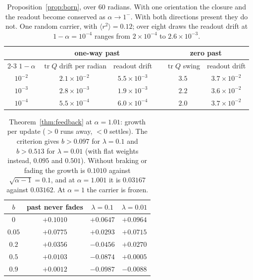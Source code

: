 \documentclass[11pt]{amsart}
\theoremstyle{definition}
\theoremstyle{remark}
\newcommand{\tr}{\operatorname{tr}}
\begin{document}
\begin{table}[h]
\centering\small
\begin{tabular}{cccccc}
\toprule
 & \multicolumn{2}{c}{one-way past} & & \multicolumn{2}{c}{zero past}\\
\cmidrule{2-3}\cmidrule{5-6}
$1-\alpha$ & $\tr Q$ drift per radian & readout drift & & $\tr Q$ swing & readout drift\\
\midrule
$10^{-2}$ & $2.1\times10^{-2}$ & $5.5\times10^{-3}$ & & $3.5$ & $3.7\times10^{-2}$\\
$10^{-3}$ & $2.8\times10^{-3}$ & $1.9\times10^{-3}$ & & $2.2$ & $3.6\times10^{-2}$\\
$10^{-4}$ & $5.5\times10^{-4}$ & $6.0\times10^{-4}$ & & $2.0$ & $3.7\times10^{-2}$\\
\bottomrule
\end{tabular}
\caption{Proposition~\ref{prop:born}, over $60$ radians. With one orientation the closure and the readout become conserved as $\alpha\to1^-$. With both directions present they do not. One random carrier, with $\langle r^2\rangle=0.12$; over eight draws the readout drift at $1-\alpha=10^{-4}$ ranges from $2\times10^{-4}$ to $2.6\times10^{-3}$.}
\label{tab:closure}
\end{table}

\begin{table}[h]
\centering\small
\begin{tabular}{cccc}
\toprule
$b$ & past never fades & $\lambda=0.1$ & $\lambda=0.01$\\
\midrule
$0$ & $+0.1010$ & $+0.0647$ & $+0.0964$\\
$0.05$ & $+0.0775$ & $+0.0293$ & $+0.0715$\\
$0.2$ & $+0.0356$ & $-0.0456$ & $+0.0270$\\
$0.5$ & $+0.0103$ & $-0.0874$ & $+0.0005$\\
$0.9$ & $+0.0012$ & $-0.0987$ & $-0.0088$\\
\bottomrule
\end{tabular}
\caption{Theorem~\ref{thm:feedback} at $\alpha=1.01$: growth per update ($>0$ runs away, $<0$ settles). The criterion gives $b>0.097$ for $\lambda=0.1$ and $b>0.513$ for $\lambda=0.01$ (with flat weights instead, $0.095$ and $0.501$). Without braking or fading the growth is $0.1010$ against $\sqrt{\alpha-1}=0.1$, and at $\alpha=1.001$ it is $0.03167$ against $0.03162$. At $\alpha=1$ the carrier is frozen.}
\label{tab:feedback}
\end{table}
\end{document}
